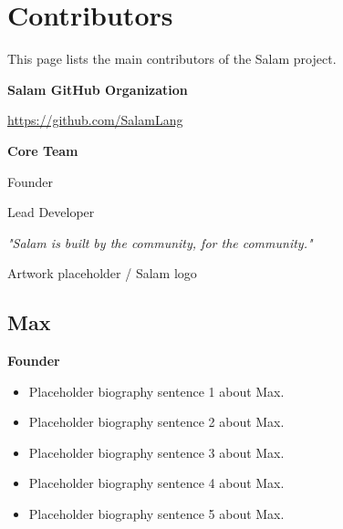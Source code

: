 \chapter*{Contributors}


This page lists the main contributors of the Salam project.

\bigskip

\textbf{Salam GitHub Organization}

\url{https://github.com/SalamLang}

\bigskip

\textbf{Core Team}

\begin{description}[leftmargin=2.5cm]
\item[Max] Founder
\item[John Bampton] Lead Developer
\end{description}

\vfill

\begin{center}
\textit{"Salam is built by the community, for the community."}
\end{center}

\vspace{1cm}

\begin{center}
\small Artwork placeholder / Salam logo
\end{center}

\clearpage


\section*{Max}

\textbf{Founder}

\bigskip

\begin{itemize}
\item Placeholder biography sentence 1 about Max.
\item Placeholder biography sentence 2 about Max.
\item Placeholder biography sentence 3 about Max.
\item Placeholder biography sentence 4 about Max.
\item Placeholder biography sentence 5 about Max.
\end{itemize}

\bigskip

